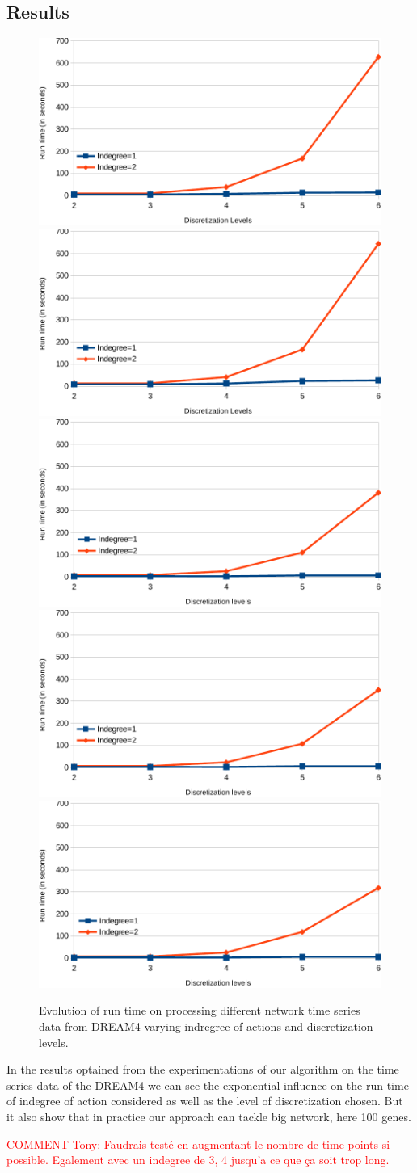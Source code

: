 \subsection{Results}

	\begin{figure} \centering
	\includegraphics[width=0.32\linewidth]{images/net1}
	\includegraphics[width=0.32\linewidth]{images/net2}
	\includegraphics[width=0.32\linewidth]{images/net3}
	\includegraphics[width=0.33\linewidth]{images/net4}
	\includegraphics[width=0.33\linewidth]{images/net5}
	\label{fig:run_time}
	\caption{Evolution of run time on processing different network time series data from DREAM4 varying indregree of actions and discretization levels.}
	\end{figure}

	In the results optained from the experimentations of our algorithm on the time series data of the DREAM4 we can see the exponential influence on the run time of indegree of action considered as well as the level of discretization chosen.
	But it also show that in practice our approach can tackle big network, here 100 genes.

\textcolor{red}{COMMENT Tony: Faudrais testé en augmentant le nombre de time points si possible. Egalement avec un indegree de 3, 4 jusqu'a ce que ça soit trop long.}

